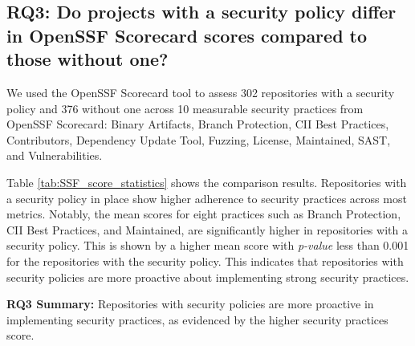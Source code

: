 
\subsection{RQ3: Do projects with a security policy differ in OpenSSF Scorecard scores compared to those without one?}

We used the OpenSSF Scorecard tool to assess 302 repositories with a security policy and 376 without one across 10 measurable security practices from OpenSSF Scorecard: Binary Artifacts, Branch Protection, CII Best Practices, Contributors, Dependency Update Tool, Fuzzing, License, Maintained, SAST, and Vulnerabilities. 

Table \ref{tab:SSF_score_statistics} shows the comparison results. Repositories with a security policy in place show higher adherence to security practices across most metrics. Notably, the mean scores for eight practices such as Branch Protection, CII Best Practices, and Maintained, are significantly higher in repositories with a security policy. This is shown by a higher mean score with \textit{p-value} less than 0.001 for the repositories with the security policy. This indicates that repositories with security policies are more proactive about implementing strong security practices.

\textbf{RQ3 Summary:} Repositories with security policies are more proactive in implementing security practices, as evidenced by the higher security practices score.



